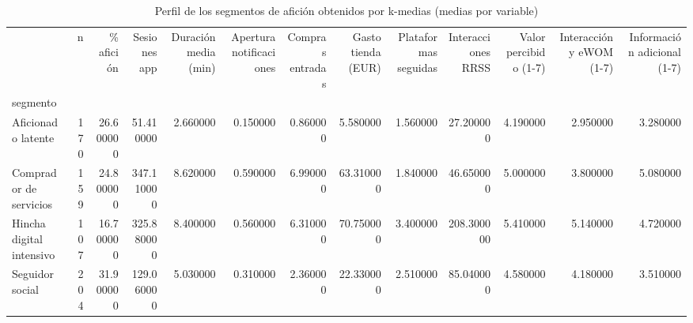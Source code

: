 \begin{table}
\caption{Perfil de los segmentos de afición obtenidos por k-medias (medias por variable)}
\label{tab:perfil_segmentos}
\begin{tabular}{lrrrrrrrrrrrr}
\toprule
 & n & \% afición & Sesiones app & Duración media (min) & Apertura notificaciones & Compras entradas & Gasto tienda (EUR) & Plataformas seguidas & Interacciones RRSS & Valor percibido (1-7) & Interacción y eWOM (1-7) & Información adicional (1-7) \\
segmento &  &  &  &  &  &  &  &  &  &  &  &  \\
\midrule
Aficionado latente & 170 & 26.600000 & 51.410000 & 2.660000 & 0.150000 & 0.860000 & 5.580000 & 1.560000 & 27.200000 & 4.190000 & 2.950000 & 3.280000 \\
Comprador de servicios & 159 & 24.800000 & 347.110000 & 8.620000 & 0.590000 & 6.990000 & 63.310000 & 1.840000 & 46.650000 & 5.000000 & 3.800000 & 5.080000 \\
Hincha digital intensivo & 107 & 16.700000 & 325.880000 & 8.400000 & 0.560000 & 6.310000 & 70.750000 & 3.400000 & 208.300000 & 5.410000 & 5.140000 & 4.720000 \\
Seguidor social & 204 & 31.900000 & 129.060000 & 5.030000 & 0.310000 & 2.360000 & 22.330000 & 2.510000 & 85.040000 & 4.580000 & 4.180000 & 3.510000 \\
\bottomrule
\end{tabular}
\end{table}
